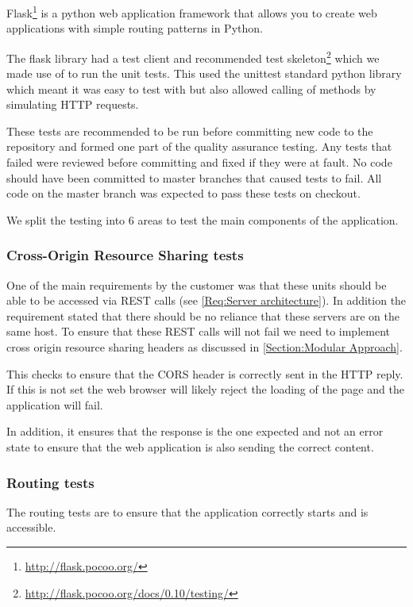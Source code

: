 Flask\footnote{\url{http://flask.pocoo.org/}} is a python web application framework that allows you to create web applications with simple routing patterns in Python.

The flask library had a test client and recommended test skeleton\footnote{\url{http://flask.pocoo.org/docs/0.10/testing/}} which we made use of to run the unit tests. This used the unittest standard python library which meant it was easy to test with but also allowed calling of methods by simulating HTTP requests.

These tests are recommended to be run before committing new code to the repository and formed one part of the quality assurance testing. Any tests that failed were reviewed before committing and fixed if they were at fault. No code should have been committed to master branches that caused tests to fail. All code on the master branch was expected to pass these tests on checkout.

We split the testing into 6 areas to test the main components of the application.

\subsubsection{Cross-Origin Resource Sharing tests}

One of the main requirements by the customer was that these units should be able to be accessed via REST calls (see \cref{Req:Server architecture}). In addition the requirement stated that there should be no reliance that these servers are on the same host. To ensure that these REST calls will not fail we need to implement cross origin resource sharing headers as discussed in \autoref{Section:Modular Approach}.

This checks to ensure that the CORS header is correctly sent in the HTTP reply. If this is not set the web browser will likely reject the loading of the page and the application will fail.

In addition, it ensures that the response is the one expected and not an error state to ensure that the web application is also sending the correct content.

\subsubsection{Routing tests}

The routing tests are to ensure that the application correctly starts and is accessible.

